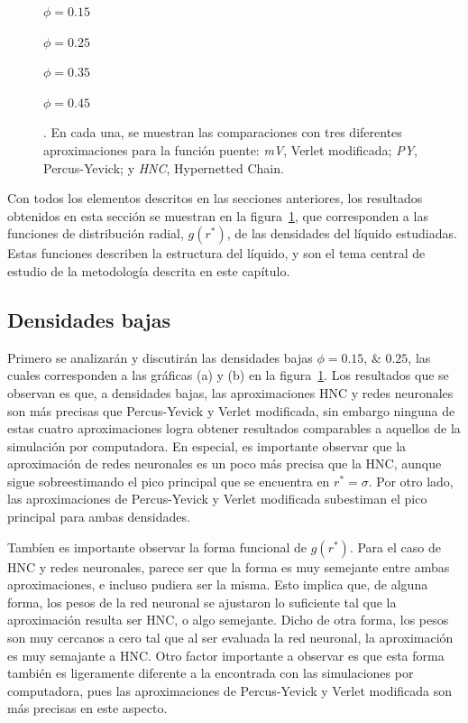 \begin{figure}[p]
{    \begin{enumerate*}[label=(\alph*),itemjoin={,\enspace}]
        \item $\phi=\num{0.15}$
        \item $\phi=\num{0.25}$
        \item $\phi=\num{0.35}$
        \item $\phi=\num{0.45}$
    \end{enumerate*}
    . En cada una, se muestran las comparaciones con tres diferentes aproximaciones para la función puente: \emph{mV}, Verlet modificada; \emph{PY}, Percus-Yevick; y \emph{HNC}, Hypernetted Chain.
    }
    \label{fig:estructuras-neuronales}
\end{figure}

Con todos los elementos descritos en las secciones anteriores, los resultados obtenidos en 
esta sección se muestran en la figura~\ref{fig:estructuras-neuronales}, que corresponden
a las funciones de distribución radial, $g(r^*)$, de las densidades del líquido estudiadas.
Estas funciones describen la estructura del líquido, y son el tema central de estudio
de la metodología descrita en este capítulo.

\subsection{Densidades bajas}
Primero se analizarán y discutirán las densidades bajas $\phi=\numlist{0.15; 0.25}$,
las cuales corresponden a las gráficas (a) y (b) en la figura~\ref{fig:estructuras-neuronales}.
Los resultados que se observan es que, a densidades bajas, las aproximaciones HNC y
redes neuronales son más precisas que Percus-Yevick y Verlet modificada, sin embargo
ninguna de estas cuatro aproximaciones logra obtener resultados comparables a aquellos
de la simulación por computadora. En especial, es importante observar que
la aproximación de redes neuronales es un poco más precisa que la HNC, aunque sigue 
sobreestimando el pico principal que se encuentra en $r^* = \sigma$.
Por otro lado, las aproximaciones de Percus-Yevick y Verlet modificada subestiman el pico
principal para ambas densidades.

Tambíen es importante observar la forma funcional de $g(r^*)$. Para el caso de HNC y redes 
neuronales, parece ser que la forma es muy semejante entre ambas aproximaciones, e incluso 
pudiera ser la misma. Esto implica que, de alguna forma, los pesos de la red neuronal se 
ajustaron lo suficiente tal que la aproximación resulta ser HNC, o algo semejante.
Dicho de otra forma, los pesos son muy cercanos a cero tal que al ser
evaluada la red neuronal, la aproximación es muy semajante a HNC.
Otro factor importante a observar es que esta forma también es ligeramente diferente a
la encontrada con las simulaciones por computadora, pues las aproximaciones de
Percus-Yevick y Verlet modificada son más precisas en este aspecto.

